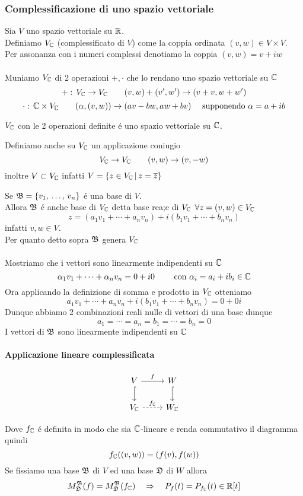 \subsubsection*{Complessificazione di uno spazio vettoriale}
Sia $V$ uno spazio vettoriale su $\mathbb{R}$.\\
Definiamo $V_{\mathbb{C}} $ (complessificato di $V$) come la coppia ordinata $ (v , w) \in V \times V $.\\
Per assonanza con i numeri complessi denotiamo la coppia $(v,w) = v +i w $\\
\\
Muniamo $V_{\mathbb{C}} $ di 2 operazioni $+ , \cdot $ che lo rendano uno spazio vettoriale su  $\mathbb{C}$ 
$$ + : \, V_{\mathbb{C}} \to V_{\mathbb{C}} \qquad  ( v, w) + (v',w') \to (v+v, w+w') $$
$$ \cdot: \, \mathbb{C} \times V_{\mathbb{C}} \qquad (\alpha ,(v,w)) \to ( av -bw, aw + bv) \quad \text{ supponendo } \alpha=a+ ib $$
\begin{prop} $V_{\mathbb{C}}$ con le 2 operazioni definite \'e uno spazio vettoriale su $\mathbb{C}$.\end{prop}
Definiamo anche su $V_{\mathbb{C}}$ un applicazione coniugio
$$ V_{\mathbb{C}} \to V_{\mathbb{C}} \qquad (v,w) \to (v,-w) $$
inoltre $V \subset V_{\mathbb{C}} $ infatti $V=\{z \in V_{\mathbb{C}} \, \vert \, z =\overline{z}\}$
\spazio
\begin{lem}\bianco
Se $\mathfrak{B}=\{ v_1, \, \dots , \, v_n \} $ \'e una base di $V$.\\
Allora $\mathfrak{B}$ \'e anche base di $V_{\mathbb{C}}$ detta base rea;e di $V_{\mathbb{C}}$ 
\proof $ \forall z =(v,w) \in V_{\mathbb{C}} $ 
$$ z  =(a_1 v_1 + \cdots + a_n v_n ) + i ( b_1 v_1 + \cdots + b_n v_n) $$ 
infatti $v,w \in V$.\\
Per quanto detto sopra $\mathfrak{B}$ genera $V_{\mathbb{C}}$ \\ \\ 
Mostriamo che i vettori sono linearmente indipendenti su $\mathbb{C}$ 
$$ \alpha_1 v_1 + \cdots + \alpha_n v_n =0+i0 \qquad \text{ con } \alpha_i=a_i + i b_i  \in \mathbb{C}$$
Ora applicando la definizione di somma e prodotto in $V_{\mathbb{C}}$ otteniamo
$$ a_1 v_1 + \cdots + a_n v_n + i( b_1 v_1 + \cdots + b_n v_n )=0+0i$$
Dunque abbiamo 2 combinazioni reali nulle di vettori di una base dunque
$$ a_1= \cdots = a_n = b_1= \cdots = b_n =0 $$
I vettori di $\mathfrak{B}$ sono linearmente indipendenti su $\mathbb{C}$ 
\endproof
\paragraph*{Applicazione lineare complessificata}
$$\begin{tikzcd} 
V \arrow{r}{f} \arrow[d,hook] 
&W \arrow[d,hook]\\ 
V_\C \arrow[dashed]{r}{f_\C}&W_\C
\end{tikzcd} $$
\end{lem}
Dove $f_{\mathbb{C}}$ \'e definita in modo che sia $\mathbb{C}$-lineare e renda commutativo il diagramma quindi
$$ f_{\mathbb{C}} ((v,w))=(f(v),f(w))$$
Se fissiamo una base $\mathfrak{B}$ di $V$ ed una base $\mathfrak{D}$ di $W$ allora
$$ M_{\mathfrak{D}} ^{\mathfrak{B}} (f) =M_{\mathfrak{D}} ^{\mathfrak{B}} (f_{\mathbb{C}}) \quad \Rightarrow \quad
P_f(t) = P_{f_{\mathbb{C}}} (t) \in \mathbb{R}[t]$$ 
\newpage
